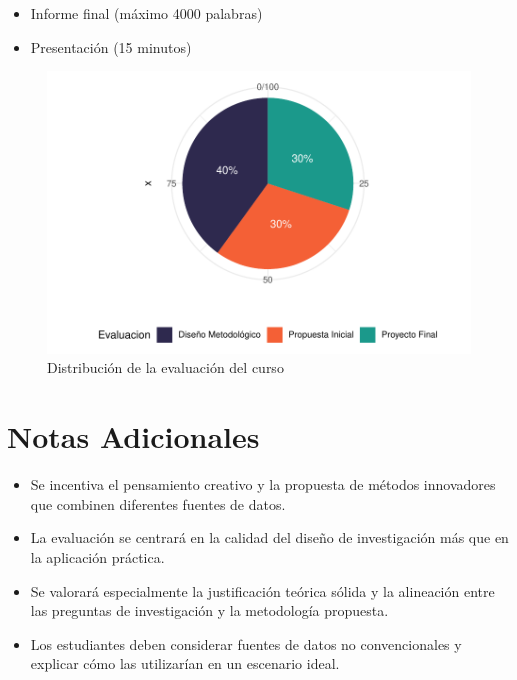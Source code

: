 \documentclass[11pt,letter,]{article}
\makeatletter
\providecommand{\tightlist}{%
  \setlength{\itemsep}{0pt}\setlength{\parskip}{0pt}}
\def\maxwidth{\ifdim\Gin@nat@width>\linewidth\linewidth
\else\Gin@nat@width\fi}
\let\Oldincludegraphics\includegraphics
\renewcommand{\includegraphics}[1]{\Oldincludegraphics[width=\maxwidth]{#1}}
\makeatother
\begin{document}
\begin{itemize}
\tightlist
\item
  Informe final (máximo 4000 palabras)
\item
  Presentación (15 minutos)
\end{itemize}

\begin{figure}

{\centering \includegraphics{programa_files/figure-pdf/unnamed-chunk-1-1.pdf}

}

\caption{Distribución de la evaluación del curso}

\end{figure}

\hypertarget{notas-adicionales}{%
\section{Notas Adicionales}\label{notas-adicionales}}

\begin{tcolorbox}[enhanced jigsaw, toprule=.15mm, leftrule=.75mm, left=2mm, bottomrule=.15mm, title=\textcolor{quarto-callout-note-color}{\faInfo}\hspace{0.5em}{Note}, toptitle=1mm, breakable, opacitybacktitle=0.6, colback=white, colbacktitle=quarto-callout-note-color!10!white, coltitle=black, colframe=quarto-callout-note-color-frame, opacityback=0, bottomtitle=1mm, titlerule=0mm, arc=.35mm, rightrule=.15mm]

\begin{itemize}
\tightlist
\item
  Se incentiva el pensamiento creativo y la propuesta de métodos
  innovadores que combinen diferentes fuentes de datos.
\item
  La evaluación se centrará en la calidad del diseño de investigación
  más que en la aplicación práctica.
\item
  Se valorará especialmente la justificación teórica sólida y la
  alineación entre las preguntas de investigación y la metodología
  propuesta.
\item
  Los estudiantes deben considerar fuentes de datos no convencionales y
  explicar cómo las utilizarían en un escenario ideal.
\end{itemize}

\end{tcolorbox}
\end{document}
